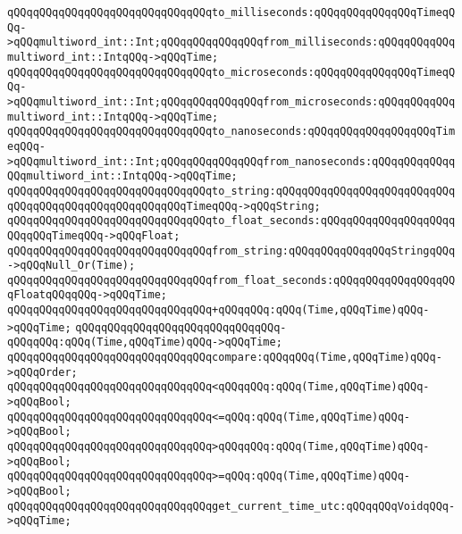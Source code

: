 \verb|qQQqqQQqqQQqqQQqqQQqqQQqqQQqqQQqto_milliseconds:qQQqqQQqqQQqqQQqTimeqQQq->qQQqmultiword_int::Int;qQQqqQQqqQQqqQQqfrom_milliseconds:qQQqqQQqqQQqmultiword_int::IntqQQq->qQQqTime;|\newline
\verb|qQQqqQQqqQQqqQQqqQQqqQQqqQQqqQQqto_microseconds:qQQqqQQqqQQqqQQqTimeqQQq->qQQqmultiword_int::Int;qQQqqQQqqQQqqQQqfrom_microseconds:qQQqqQQqqQQqmultiword_int::IntqQQq->qQQqTime;|\newline
\verb|qQQqqQQqqQQqqQQqqQQqqQQqqQQqqQQqto_nanoseconds:qQQqqQQqqQQqqQQqqQQqTimeqQQq->qQQqmultiword_int::Int;qQQqqQQqqQQqqQQqfrom_nanoseconds:qQQqqQQqqQQqqQQqmultiword_int::IntqQQq->qQQqTime;|\newline
\newline
\verb|qQQqqQQqqQQqqQQqqQQqqQQqqQQqqQQqto_string:qQQqqQQqqQQqqQQqqQQqqQQqqQQqqQQqqQQqqQQqqQQqqQQqqQQqqQQqTimeqQQq->qQQqString;|\newline
\verb|qQQqqQQqqQQqqQQqqQQqqQQqqQQqqQQqto_float_seconds:qQQqqQQqqQQqqQQqqQQqqQQqqQQqTimeqQQq->qQQqFloat;|\newline
\newline
\verb|qQQqqQQqqQQqqQQqqQQqqQQqqQQqqQQqfrom_string:qQQqqQQqqQQqqQQqStringqQQq->qQQqNull_Or(Time);|\newline
\verb|qQQqqQQqqQQqqQQqqQQqqQQqqQQqqQQqfrom_float_seconds:qQQqqQQqqQQqqQQqqQQqFloatqQQqqQQq->qQQqTime;|\newline
\newline
\verb|qQQqqQQqqQQqqQQqqQQqqQQqqQQqqQQq+qQQqqQQq:qQQq(Time,qQQqTime)qQQq->qQQqTime;|\newline
\verb|qQQqqQQqqQQqqQQqqQQqqQQqqQQqqQQq-qQQqqQQq:qQQq(Time,qQQqTime)qQQq->qQQqTime;|\newline
\newline
\verb|qQQqqQQqqQQqqQQqqQQqqQQqqQQqqQQqcompare:qQQqqQQq(Time,qQQqTime)qQQq->qQQqOrder;|\newline
\newline
\verb|qQQqqQQqqQQqqQQqqQQqqQQqqQQqqQQq<qQQqqQQq:qQQq(Time,qQQqTime)qQQq->qQQqBool;|\newline
\verb|qQQqqQQqqQQqqQQqqQQqqQQqqQQqqQQq<=qQQq:qQQq(Time,qQQqTime)qQQq->qQQqBool;|\newline
\verb|qQQqqQQqqQQqqQQqqQQqqQQqqQQqqQQq>qQQqqQQq:qQQq(Time,qQQqTime)qQQq->qQQqBool;|\newline
\verb|qQQqqQQqqQQqqQQqqQQqqQQqqQQqqQQq>=qQQq:qQQq(Time,qQQqTime)qQQq->qQQqBool;|\newline
\newline
\verb|qQQqqQQqqQQqqQQqqQQqqQQqqQQqqQQqget_current_time_utc:qQQqqQQqVoidqQQq->qQQqTime;|\newline
